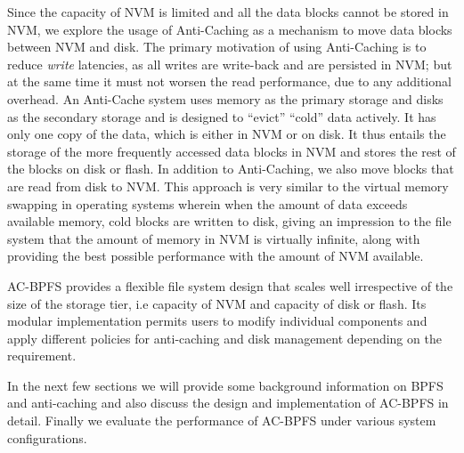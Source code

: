 Since the capacity of NVM is limited and all the data blocks cannot be stored in NVM, we explore the usage of Anti-Caching \cite{c13} as a mechanism to move data blocks between NVM and disk. The primary motivation of using Anti-Caching is to reduce \textit{write} latencies, as all writes are write-back and are persisted in NVM; but at the same time it must not worsen the read performance, due to any additional overhead. An Anti-Cache system uses memory as the primary storage and disks as the secondary storage and is designed to “evict” “cold” data actively. It has only one copy of the data, which is either in NVM or on disk. It thus entails the storage of the more frequently accessed data blocks in NVM and stores the rest of the blocks on disk or flash. In addition to Anti-Caching, we also move blocks that are read from disk to NVM. This approach is very similar to the virtual memory swapping in operating systems wherein when the amount of data exceeds available memory, cold blocks are written to disk, giving an impression to the file system that the amount of memory in NVM is virtually infinite, along with providing the best possible performance with the amount of NVM available.

AC-BPFS provides a flexible file system design that scales well irrespective of the size of the storage tier, i.e capacity of NVM and capacity of disk or flash. Its modular implementation permits users to modify individual components and apply different policies for anti-caching and disk management depending on the requirement. 

In the next few sections we will provide some background information on BPFS and anti-caching and also discuss the design and implementation of AC-BPFS in detail. Finally we evaluate the performance of AC-BPFS under various system configurations.   


 

